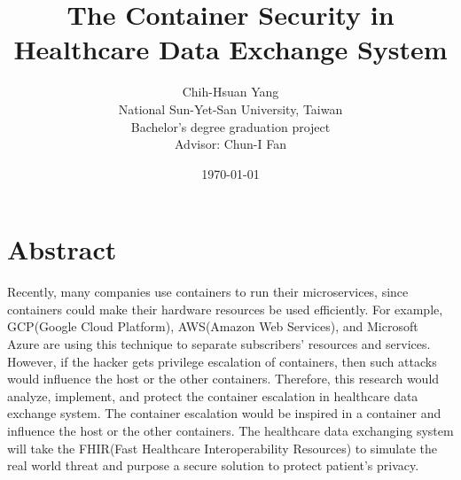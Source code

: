 \documentclass[12pt,a4paper]{IEEEconf}
\title{{The Container Security in Healthcare Data Exchange System}}
\author{Chih-Hsuan Yang\\
National Sun-Yet-San University, Taiwan \\
Bachelor's degree graduation project \\
Advisor: Chun-I Fan
}
\date{\today}
\begin{document}
\maketitle



\section{Abstract}
Recently, many companies use containers to run their microservices, since containers could
make their hardware resources be used efficiently. For example, GCP(Google Cloud Platform),
AWS(Amazon Web Services), and Microsoft Azure are using this technique to separate subscribers'
resources and services. However, if the hacker gets privilege escalation of containers, then
such attacks would influence the host or the other containers.
Therefore, this research would analyze, implement, and protect the container escalation in
healthcare data exchange system.
The container escalation would be inspired in a container and influence the host or the
other containers. The healthcare data exchanging system will take the FHIR(Fast
Healthcare Interoperability Resources)\cite{FHIR_home} to simulate the real world threat and
purpose a secure solution to protect patient's privacy.

\end{document}
